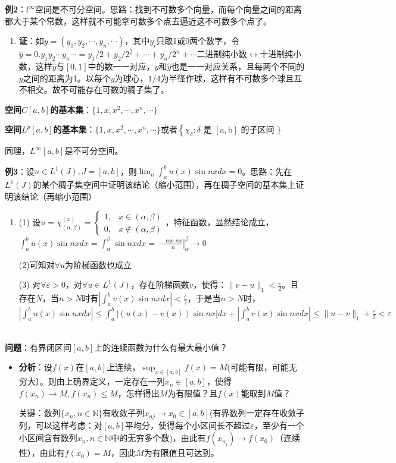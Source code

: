 \documentclass[12pt,a4paper]{article}
\begin{document}
\textbf{例2}：$l^{\infty}$空间是不可分空间。思路：找到不可数多个向量，而每个向量之间的距离都大于某个常数，这样就不可能拿可数多个点去逼近这不可数多个点了。
\begin{enumerate}
	\item []
	\textbf{证}：如$y=(y_1,y_2,\cdots,y_n,\cdots)$，其中$y_i$只取1或0两个数字，令$\hat{y}=0.y_1y_2\cdots y_n\cdots=y_1/2+y_2/2^2+\cdots+y_n/2^n+\cdots$二进制纯小数$\leftrightarrow$十进制纯小数，这样$\hat{y}$与$[0,1]$中的数一一对应，$y$和$\hat{y}$也是一一对应关系，且每两个不同的$y$之间的距离为1。以每个$y$为球心，$1/4$为半径作球，这样有不可数多个球且互不相交。故不可能存在可数的稠子集了。
\end{enumerate}

\textbf{空间$C[a,b]$的基本集}：$\{1,x,x^2,\cdots,x^n,\cdots \}$

\textbf{空间$L^p[a,b]$的基本集}：$\{1,x,x^2,\cdots,x^n,\cdots \}$或者$\left\{\chi_{\delta}: \delta\right.$ 是 $[\mathrm{a}, \mathrm{b}]$ 的子区间 $\}$

同理，$L^{\infty}[a,b]$是不可分空间。

\textbf{例3}：设$u\in L^1(J),J=[a,b]$，则$\lim_n\int_a^bu(x)\sin nxdx=0$。思路：先在$L^1(J)$的某个稠子集空间中证明该结论（缩小范围），再在稠子空间的基本集上证明该结论（再缩小范围）
\begin{enumerate}
	\item []
	(1) 设$u=\chi^{(x)}_{(\alpha,\beta)}=\begin{cases}1, & x \in(\alpha, \beta) \\ 0, & x \notin(\alpha, \beta)\end{cases}$，特征函数，显然结论成立，$\int_a^bu(x)\sin nxdx=\int_\alpha^\beta \sin nxdx=-\left.\frac{\cos n x}{n}\right|_{\alpha} ^{\beta} \rightarrow 0$
	
	(2)可知对$\forall u$为阶梯函数也成立
	
	(3) 对$\forall\varepsilon>0$，对$\forall u\in L^1(J)$，存在阶梯函数$v$，使得：$\|v-u\|_1<\frac{\varepsilon}{2}$。且存在$N$，当$n>N$时有$\left|\int_a^bv(x)\sin nxdx\right|<\frac{\varepsilon}{2}$，于是当$n>N$时，$\left|\int_a^bu(x)\sin nxdx\right|\leqslant \int_a^b\left|(u(x)-v(x))\sin nx\right|dx+\left|\int_a^bv(x)\sin nxdx\right|\leqslant\|u-v\|_1+\frac{\varepsilon}{2}<\varepsilon$
\end{enumerate}
~\\
\textbf{问题}：有界闭区间$[a,b]$上的连续函数为什么有最大最小值？
\begin{itemize}
	\item []
	\textbf{分析}：设$f(x)$在$[a,b]$上连续，$\sup_{x\in[a,b]}f(x)=M$(可能有限，可能无穷大）。则由上确界定义，一定存在一列$x_n\in[a,b]$，使得$f(x_n)\rightarrow M,f(x_n)\leqslant M$，怎样得出$M$为有限值？且$f(x)$能取到$M$值？
	
	关键：数列$\{x_n,n\in\mathbb{N}\}$有收敛子列$x_{nj}\rightarrow x_0\in [a,b]$(有界数列一定存在收敛子列，可以这样考虑：对$[a,b]$平均分，使得每个小区间长不超过$\varepsilon$，至少有一个小区间含有数列${x_n,n\in \mathbb{N}}$中的无穷多个数)，由此有$f(x_{{n_j}})\rightarrow f(x_0)$（连续性），由此有$f(x_0)=M$，因此$M$为有限值且可达到。
\end{itemize}
\end{document}
